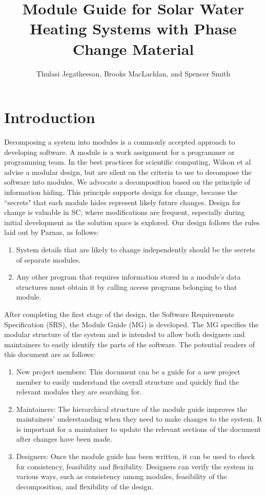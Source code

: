 \documentclass[12pt]{article}
\title{Module Guide for Solar Water Heating Systems with Phase Change Material}
\author{Thulasi Jegatheesan, Brooks MacLachlan, and Spencer Smith}
\begin{document}
\maketitle
\tableofcontents
\newpage
\section{Introduction}
\label{Sec:Intr}
Decomposing a system into modules is a commonly accepted approach to developing software.  A module is a work assignment for a programmer or programming team. In the best practices for scientific computing, Wilson et al advise a modular design, but are silent on the criteria to use to decompose the software into modules.  We advocate a decomposition based on the principle of information hiding. This principle supports design for change, because the ``secrets" that each module hides represent likely future changes.  Design for change is valuable in SC, where modifications are frequent, especially during initial development as the solution space is explored.
Our design follows the rules laid out by Parnas, as follows:
\begin{enumerate}
\item{System details that are likely to change independently should be the secrets of separate modules.}
\item{Any other program that requires information stored in a module's data structures must obtain it by calling access programs belonging to that module.}
\end{enumerate}
After completing the first stage of the design, the Software Requirements Specification (SRS), the Module Guide (MG) is developed. The MG specifies the modular structure of the system and is intended to allow both designers and maintainers to easily identify the parts of the software.  The potential readers of this document are as follows:
\begin{enumerate}
\item{New project members: This document can be a guide for a new project member to easily understand the overall structure and quickly find the relevant modules they are searching for.}
\item{Maintainers: The hierarchical structure of the module guide improves the maintainers' understanding when they need to make changes to the system. It is important for a maintainer to update the relevant sections of the document after changes have been made.}
\item{Designers: Once the module guide has been written, it can be used to check for consistency, feasibility and flexibility. Designers can verify the system in various ways, such as consistency among modules, feasibility of the decomposition, and flexibility of the design.}
\end{enumerate}
\end{document}
